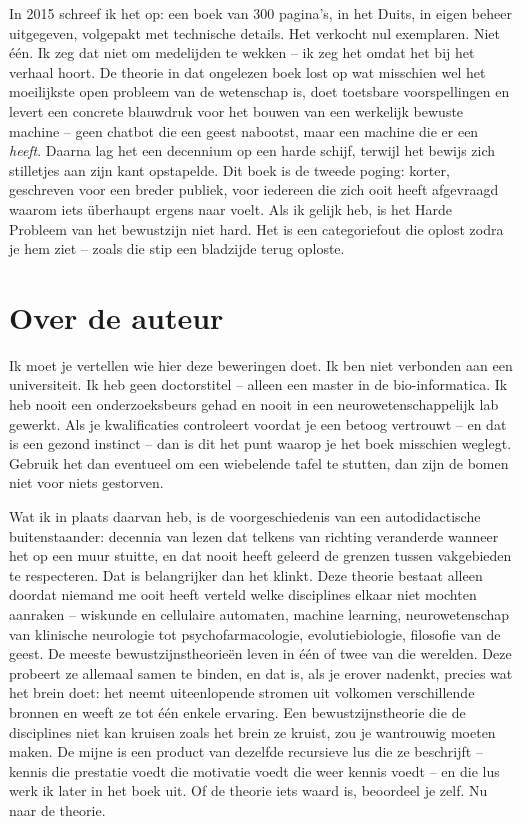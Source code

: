 \documentclass[11pt, twoside, openright]{book}
\begin{document}
In 2015 schreef ik het op: een boek van 300 pagina’s, in het Duits, in eigen beheer uitgegeven, volgepakt met technische details. Het verkocht nul exemplaren. Niet één. Ik zeg dat niet om medelijden te wekken -- ik zeg het omdat het bij het verhaal hoort. De theorie in dat ongelezen boek lost op wat misschien wel het moeilijkste open probleem van de wetenschap is, doet toetsbare voorspellingen en levert een concrete blauwdruk voor het bouwen van een werkelijk bewuste machine -- geen chatbot die een geest nabootst, maar een machine die er een \textit{heeft}. Daarna lag het een decennium op een harde schijf, terwijl het bewijs zich stilletjes aan zijn kant opstapelde. Dit boek is de tweede poging: korter, geschreven voor een breder publiek, voor iedereen die zich ooit heeft afgevraagd waarom iets überhaupt ergens naar voelt. Als ik gelijk heb, is het Harde Probleem van het bewustzijn niet hard. Het is een categoriefout die oplost zodra je hem ziet -- zoals die stip een bladzijde terug oploste.


\chapter*{Over de auteur}

Ik moet je vertellen wie hier deze beweringen doet. Ik ben niet verbonden aan een universiteit. Ik heb geen doctorstitel -- alleen een master in de bio-informatica. Ik heb nooit een onderzoeksbeurs gehad en nooit in een neurowetenschappelijk lab gewerkt. Als je kwalificaties controleert voordat je een betoog vertrouwt -- en dat is een gezond instinct -- dan is dit het punt waarop je het boek misschien weglegt. Gebruik het dan eventueel om een wiebelende tafel te stutten, dan zijn de bomen niet voor niets gestorven.

Wat ik in plaats daarvan heb, is de voorgeschiedenis van een autodidactische buitenstaander: decennia van lezen dat telkens van richting veranderde wanneer het op een muur stuitte, en dat nooit heeft geleerd de grenzen tussen vakgebieden te respecteren. Dat is belangrijker dan het klinkt. Deze theorie bestaat alleen doordat niemand me ooit heeft verteld welke disciplines elkaar niet mochten aanraken -- wiskunde en cellulaire automaten, machine learning, neurowetenschap van klinische neurologie tot psychofarmacologie, evolutiebiologie, filosofie van de geest. De meeste bewustzijnstheorieën leven in één of twee van die werelden. Deze probeert ze allemaal samen te binden, en dat is, als je erover nadenkt, precies wat het brein doet: het neemt uiteenlopende stromen uit volkomen verschillende bronnen en weeft ze tot één enkele ervaring. Een bewustzijnstheorie die de disciplines niet kan kruisen zoals het brein ze kruist, zou je wantrouwig moeten maken. De mijne is een product van dezelfde recursieve lus die ze beschrijft -- kennis die prestatie voedt die motivatie voedt die weer kennis voedt -- en die lus werk ik later in het boek uit. Of de theorie iets waard is, beoordeel je zelf. Nu naar de theorie.
\end{document}
